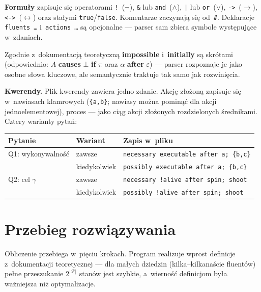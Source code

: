 \documentclass[11pt,a4paper]{article}
\begin{document}
\textbf{Formuły} zapisuje się operatorami \texttt{!}~($\lnot$),
\texttt{\&} lub \texttt{and}~($\land$), \texttt{|} lub \texttt{or}~($\lor$),
\texttt{->}~($\rightarrow$), \texttt{<->}~($\leftrightarrow$) oraz stałymi
\texttt{true}/\texttt{false}. Komentarze zaczynają się od~\texttt{\#}.
Deklaracje \texttt{fluents \dots} i~\texttt{actions \dots} są opcjonalne ---
parser sam zbiera symbole występujące w~zdaniach.

Zgodnie z~dokumentacją teoretyczną \textbf{impossible} i~\textbf{initially}
są skrótami (odpowiednio: $A$ \textbf{causes} $\bot$ \textbf{if} $\pi$ oraz
$\alpha$ \textbf{after} $\varepsilon$) --- parser rozpoznaje je jako osobne
słowa kluczowe, ale semantycznie traktuje tak samo jak rozwinięcia.

\textbf{Kwerendy.} Plik kwerendy zawiera jedno zdanie. Akcję złożoną zapisuje
się w~nawiasach klamrowych (\texttt{\{a,b\}}; nawiasy można pominąć dla akcji
jednoelementowej), proces --- jako ciąg akcji złożonych rozdzielonych
średnikami. Cztery warianty pytań:

\begin{center}
\small
\begin{tabular}{@{}lll@{}}
\toprule
\textbf{Pytanie} & \textbf{Wariant} & \textbf{Zapis w~pliku} \\
\midrule
Q1: wykonywalność & zawsze       & \texttt{necessary executable after a; \{b,c\}} \\
                  & kiedykolwiek & \texttt{possibly executable after a; \{b,c\}} \\
Q2: cel $\gamma$  & zawsze       & \texttt{necessary !alive after spin; shoot} \\
                  & kiedykolwiek & \texttt{possibly !alive after spin; shoot} \\
\bottomrule
\end{tabular}
\end{center}

\section{Przebieg rozwiązywania}

Obliczenie przebiega w~pięciu krokach. Program realizuje wprost definicje
z~dokumentacji teoretycznej --- dla małych dziedzin (kilka--kilkanaście
fluentów) pełne przeszukanie $2^{|\mathcal{F}|}$ stanów jest szybkie,
a~wierność definicjom była ważniejsza niż optymalizacje.
\end{document}
